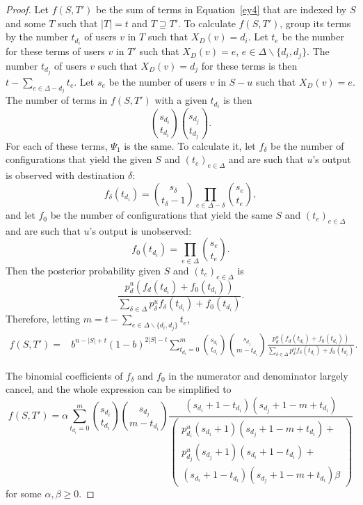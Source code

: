\documentclass[prodmode,acmtissec]{acmsmall}
\begin{document}
\begin{proof}
Let $f(S,T')$ be the sum of terms in Equation~\ref{ey4} that are indexed by $S$ and some $T$ such that $|T|=t$ and $T\supseteq T'$.  To calculate $f(S,T')$, group its terms by the number $t_{d_i}$ of users $v$ in $T$ such that $X_D(v)=d_i$.  Let $t_e$ be the number for these terms of users $v$ in $T'$ such that $X_D(v)=e$, $e\in \Delta \backslash \{d_i,d_j\}$.  The number $t_{d_j}$ of users $v$ such that $X_D(v)=d_j$ for these terms is then $t-\sum_{e\in \Delta - d_j} t_e$.  Let $s_e$ be the number of users $v$ in $S-u$ such that $X_D(v)=e$. The number of terms in $f(S,T')$ with a given $t_{d_i}$ is then
\begin{equation*}
\binom{s_{d_i}}{t_{d_i}} \binom{s_{d_j}}{t_{d_j}}.
\end{equation*}
For each of these terms, $\Psi_1$ is the same.  To calculate it, let $f_{\delta}$ be the number of configurations that yield the given $S$ and $(t_e)_{e\in \Delta}$ and are such that $u$'s output is observed with destination $\delta$:
\begin{equation*}
f_{\delta}(t_{d_i}) = \binom{s_{\delta}}{t_{\delta}-1} \prod_{e\in \Delta - \delta} \binom{s_{e}}{t_{e}},
\end{equation*}
and let $f_0$ be the number of configurations that yield the same $S$ and $(t_e)_{e\in \Delta}$ and are such that $u$'s output is unobserved:
\begin{equation*}
f_0(t_{d_i}) =  \prod_{e\in \Delta} \binom{s_e}{t_e}.
\end{equation*}
Then the posterior probability given $S$ and $(t_e)_{e\in \Delta}$ is
\begin{equation*}
\frac{p^u_d \left(f_d(t_{d_i}) + f_0(t_{d_i}) \right)}{\sum_{\delta \in \Delta} p^u_{\delta} f_{\delta}(t_{d_i}) + f_0(t_{d_i})}.
\end{equation*}
Therefore, letting $m= t-\sum_{e \in \Delta\backslash \{d_i,d_j\}} t_e$,
\begin{align*}
  f(S,T') = &b^{n-|S|+t}(1-b)^{2|S|-t}\sum_{t_{d_i}=0}^m \binom{s_{d_i}}{t_{d_i}} \binom{s_{d_j}}{m-t_{d_i}} \frac{p^u_d \left(f_d(t_{d_i}) + f_0(t_{d_i}) \right)}{\sum_{\delta \in \Delta} p^u_{\delta} f_{\delta}(t_{d_i}) + f_0(t_{d_i})}.
\end{align*}

The binomial coefficients of $f_{\delta}$ and $f_0$ in the numerator and denominator largely cancel, and the whole expression can be simplified to
\begin{equation*}
  f(S,T') = \alpha \sum_{t_{d_i}=0}^m  \binom{s_{d_i}}{t_{d_i}} \binom{s_{d_j}}{m-t_{d_i}} \frac{(s_{d_i}+1-t_{d_i})(s_{d_j}+1-m+t_{d_i})}{\left( \begin{array}{l} p^u_{d_i}(s_{d_i}+1)(s_{d_j}+1-m+t_{d_i}) +\\ p^u_{d_j}(s_{d_j}+1)(s_{d_i}+1-t_{d_i}) +\\ (s_{d_i}+1-t_{d_i})(s_{d_j}+1-m+t_{d_i})\beta \end{array} \right)}
\end{equation*}
for some $\alpha,\beta \ge 0$.




\end{proof}
\end{document}
